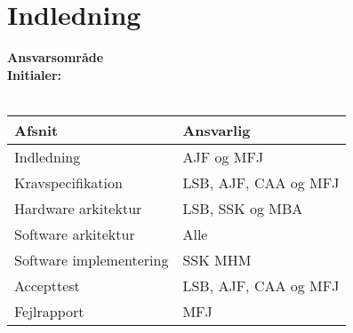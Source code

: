 \chapter{Indledning}


\textbf{Ansvarsområde} \\
\textbf{Initialer: } \\
\\

\begin{longtabu} to 
    Afsnit &    Ansvarlig\\[-1ex]
    \midrule
    Indledning & AJF og MFJ \\
    Kravspecifikation & LSB, AJF, CAA og MFJ\\
    Hardware arkitektur & LSB, SSK og MBA\\
    Software arkitektur & Alle\\
    Software implementering & SSK MHM\\
    Accepttest & LSB, AJF, CAA og MFJ\\
    Fejlrapport & MFJ\\
    
    
    

\end{longtabu}